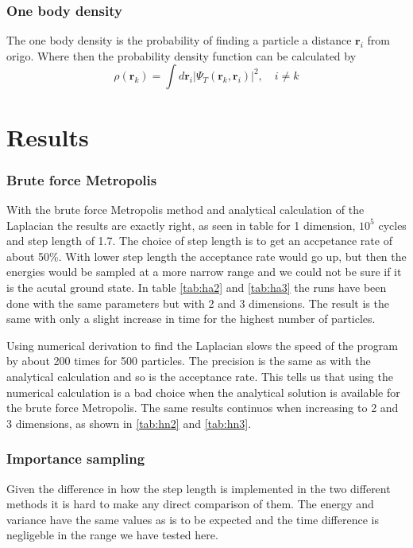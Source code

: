 \documentclass[12pt]{article}
\begin{document}
  \subsubsection{One body density}
  The one body density is the probability of finding a particle a distance ${\bm r_i}$ from
  origo. Where then the probability density function can be calculated by 
  \[ \rho({\bm r_k}) = \int d{\bm r}_i|\Psi_T({\bm r_k,\bm r_i})|^2 ,\quad i\neq k\]

  \newpage
  \section{Results}
 
  \subsubsection{Brute force Metropolis}
  
  With the brute force Metropolis method and analytical calculation of the Laplacian the
  results are exactly right, as seen in table for 1 dimension, $10^5$ cycles and step length
  of 1.7. The choice of step length is to get an accpetance rate of about 50\%. 
  With lower step length the acceptance rate would go up, but then the energies would be 
  sampled at a more narrow range and we could not be sure if it is the acutal ground state.
  In table \ref{tab:ha2} and \ref{tab:ha3} the runs have been done with the same parameters but with
  2 and 3 dimensions. The result is the same with only a slight increase in time for the highest
  number of particles.

  
  Using numerical derivation to find the Laplacian slows the speed of the program by about 200 times
  for 500 particles. The precision is the same as with the analytical calculation and so is the 
  acceptance rate. This tells us that using the numerical calculation is a bad choice when the 
  analytical solution is available for the brute force Metropolis. The same results continuos when
  increasing to 2 and 3 dimensions, as shown in \ref{tab:hn2} and \ref{tab:hn3}.
  
  \subsubsection{Importance sampling}
  
  Given the difference in how the step length is implemented in the two different methods it is
  hard to make any direct comparison of them. The energy and variance have the same values as is
  to be expected and the time difference is negligeble in the range we have tested here.
\end{document}
